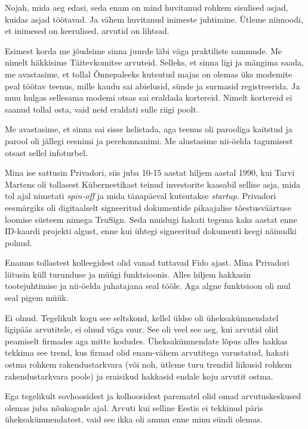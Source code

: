 
Nojah, mida aeg edasi, seda enam on mind 
huvitanud rohkem sisulised asjad, kuidas asjad töötavad. Ja vähem huvitanud 
inimeste juhtimine. Ütleme niimoodi, et inimesed on keerulised, arvutid on 
lihtsad.


Esimest korda me jõudsime sinna juurde läbi väga praktiliste sammude. Me nimelt häkkisime 
Täitevkomitee arvuteid. Selleks, et sinna ligi  ja mängima saada, me 
avastasime, et tollal Õnnepaleeks kutsutud majas on olemas üks modemite peal 
töötav teenus, mille 
 kaudu sai abielusid, sünde ja surmasid registreerida. Ja muu hulgas sellesama 
modemi otsas sai eraldada kortereid. Nimelt kortereid ei saanud tollal osta, 
vaid neid eraldati sulle riigi poolt.


Me avastasime, et sinna sai sisse helistada, aga teenus oli parooliga kaitstud 
ja parool oli jällegi eesnimi ja perekonnanimi. Me alustasime nii-öelda 
tagumisest otsast sellel infoturbel.

Mina ise sattusin Privadori, siis juba  10-15 aastat hiljem 
aastal 1990, kui Tarvi Martens oli tollasest Küberneetikast teinud 
investorite kaasabil sellise asja, mida tol ajal nimetati \emph{spin-off} ja 
mida tänapäeval kutsutakse \emph{startup}. Privadori  eesmärgiks oli  
digitaalselt signeeritud dokumentide pikaajalise tõestusväärtuse loomise 
süsteem nimega TruSign. Seda muidugi hakati tegema kaks aastat enne ID-kaardi 
projekti algust, enne kui ühtegi signeeritud dokumenti keegi näinudki polnud.

                 
Enamus tollastest kolleegidest olid vanad tuttavad Fido ajast. Mina Privadori 
liitusin  küll turunduse ja müügi funktsioonis. Alles hiljem hakkasin 
tootejuhtimise ja nii-öelda juhatajana seal tööle. Aga algne funktsioon oli mul 
seal pigem müük. 


Ei olnud. Tegelikult kogu see seltskond, kellel üldse oli üheksakümnendatel 
ligipääs arvutitele, ei olnud väga suur. See oli veel see aeg, kui arvutid olid 
peamiselt firmades aga mitte kodudes. Üheksakümnendate lõpus alles hakkas 
tekkima see trend, kus firmad olid enam-vähem arvutitega varustatud, hakati 
ostma rohkem rakendustarkvara (või noh, ütleme turu trendid liikusid rohkem 
rakendustarkvara poole) ja eraisikud hakkasid endale koju arvutit ostma.

Ega tegelikult  sovhoosidest ja kolhoosidest parematel olid omad 
arvutuskeskused olemas juba nõukogude ajal. Arvuti kui selline Eestis ei 
tekkinud päris üheksakümnendatest, vaid see ikka oli ammu enne minu sündi 
olemas. 
